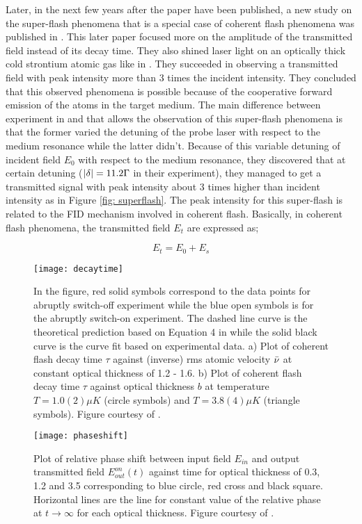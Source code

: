 Later, in the next few years after the paper \cite{Chalony2011} have been published, a new study on the super-flash phenomena that is a special case of coherent flash phenomena was published in \cite{Kwong2014}. This later paper focused more on the amplitude of the transmitted field instead of its decay time. They also shined laser light on an optically thick cold strontium atomic gas like in \cite{Chalony2011}. They succeeded in observing a transmitted field with peak intensity more than 3 times the incident intensity. They concluded that this observed phenomena is possible because of the cooperative forward emission of the atoms in the target medium. The main difference between experiment in \cite{Kwong2014} and \cite{Chalony2011} that allows the observation of this super-flash phenomena is that the former varied the detuning of the probe laser with respect to the medium resonance while the latter didn't. Because of this variable detuning of incident field $E_{0}$ with respect to the medium resonance, they discovered that at certain detuning ($\abs{\delta} = 11.2 \Gamma$ in their experiment), they managed to get a transmitted signal with peak intensity about 3 times higher than incident intensity as in Figure \ref{fig: superflash}. The peak intensity for this super-flash is related to the FID mechanism involved in coherent flash. Basically, in coherent flash phenomena, the transmitted field $E_{t}$ are expressed as;

\begin{equation}
    E_{t} = E_{0} + E_{s}
\end{equation}

\begin{figure}[b!]
    \centering
    \texttt{[image: decaytime]}
    \caption{In the figure, red solid symbols correspond to the data points for abruptly switch-off experiment while the blue open symbols is for the abruptly switch-on experiment. The dashed line curve is the theoretical prediction based on Equation 4 in \cite{Chalony2011} while the solid black curve is the curve fit based on experimental data. a) Plot of coherent flash decay time $\tau$ against (inverse) rms atomic velocity $\Bar{\nu}$ at constant optical thickness of 1.2 - 1.6. b) Plot of coherent flash decay time $\tau$ against optical thickness $b$ at temperature  $T = 1.0(2) \mu K$ (circle symbols) and $T = 3.8(4) \mu K$ (triangle symbols). Figure courtesy of \cite{Chalony2011}.}
    \label{fig: decay time}
\end{figure}

\begin{figure}[h!]
    \centering
    \texttt{[image: phaseshift]}
    \caption{Plot of relative phase shift between input field $E_{in}$ and output transmitted field $E_{out}^{on}(t)$ against time for optical thickness of 0.3, 1.2 and 3.5 corresponding to blue circle, red cross and black square. Horizontal lines are the line for constant value of the relative phase at $t \rightarrow \infty$ for each optical thickness. Figure courtesy of \cite{Chalony2011}.}
    \label{fig: relative phase}
\end{figure}

